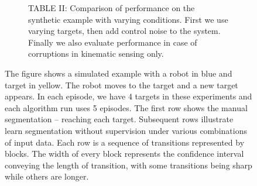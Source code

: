 \documentclass[0-main.tex]{subfiles}
\begin{document}
\begin{figure}[!t]
\begin{subfigure}[t]{2.6in}
{    }
    \caption{TABLE II: Comparison of \TSC performance on the synthetic example with varying conditions. First we use varying targets, then add control noise to the system. Finally we also evaluate performance in case of corruptions in kinematic sensing only.}
    \label{tab:toyEx}
    \par\vspace{0pt}
\end{subfigure}
\caption{The figure shows a simulated example with a robot in blue and target in yellow. The robot moves to the target and a new target appears. In each episode, we have 4 targets in these experiments and each algorithm run uses 5 episodes. The first row shows the manual segmentation -- reaching each target. Subsequent rows illustrate learn segmentation without supervision under various combinations of input data.  
Each row is a sequence of transitions represented by blocks. The width of every block represents the confidence interval conveying the length of transition, with some transitions being sharp while others are longer.}
\label{fig:toyEx}
\vspace{-15pt}
\end{figure}
\end{document}
